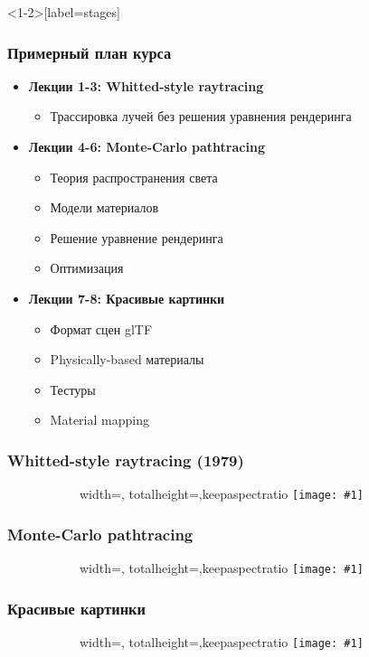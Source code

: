 \documentclass[10pt]{beamer}
\newcommand{\slideimage}[1]{
  \begin{figure}
    \begin{adjustbox}{width=\textwidth, totalheight=\textheight-2\baselineskip-2\baselineskip,keepaspectratio}
      \texttt{[image: \#1]}
    \end{adjustbox}
  \end{figure}
}
\begin{document}
\begin{frame}<1-2>[label=stages]
\frametitle{Примерный план курса}
\pause
\begin{itemize}
\item \textbf{Лекции 1-3: Whitted-style raytracing}
\begin{itemize}
\item Трассировка лучей без решения уравнения рендеринга
\end{itemize}
\pause
\item \textbf{Лекции 4-6: Monte-Carlo pathtracing}
\begin{itemize}
\item Теория распространения света
\item Модели материалов
\item Решение уравнение рендеринга
\item Оптимизация
\end{itemize}
\pause
\item \textbf{Лекции 7-8: Красивые картинки}
\begin{itemize}
\item Формат сцен glTF
\item Physically-based материалы
\item Тестуры
\item Material mapping
\end{itemize}
\end{itemize}
\end{frame}

\begin{frame}
\frametitle{Whitted-style raytracing (1979)}
\begin{figure}
\slideimage{stage1.jpg}
\end{figure}
\end{frame}


\begin{frame}
\frametitle{Monte-Carlo pathtracing}
\begin{figure}
\slideimage{stage2.jpg}
\end{figure}
\end{frame}


\begin{frame}
\frametitle{Красивые картинки}
\begin{figure}
\slideimage{stage3.jpg}
\end{figure}
\end{frame}
\end{document}

